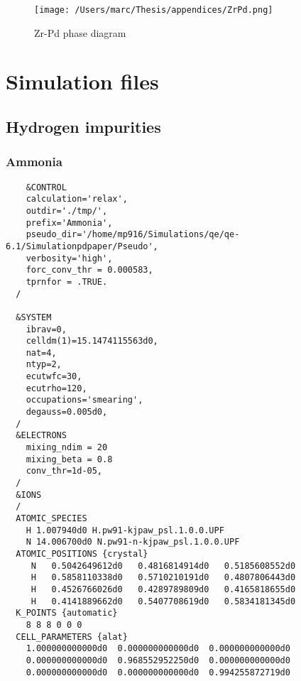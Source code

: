 \begin{figure}[H]
  \texttt{[image: /Users/marc/Thesis/appendices/ZrPd.png]}
  \caption{Zr-Pd phase diagram \cite{WATERSTRAT199963}}
\end{figure}


\section*{Simulation files}
\subsection*{Hydrogen impurities}
\subsubsection*{Ammonia}
\begin{verbatim}
    &CONTROL
    calculation='relax',
    outdir='./tmp/',
    prefix='Ammonia',
    pseudo_dir='/home/mp916/Simulations/qe/qe-6.1/Simulationpdpaper/Pseudo',
    verbosity='high',
    forc_conv_thr = 0.000583,
    tprnfor = .TRUE.
  /
  
  &SYSTEM
    ibrav=0,
    celldm(1)=15.1474115563d0,
    nat=4,
    ntyp=2,
    ecutwfc=30,
    ecutrho=120,
    occupations='smearing',
    degauss=0.005d0,
  /
  &ELECTRONS
    mixing_ndim = 20
    mixing_beta = 0.8
    conv_thr=1d-05,
  /
  &IONS
  /
  ATOMIC_SPECIES
    H 1.007940d0 H.pw91-kjpaw_psl.1.0.0.UPF
    N 14.006700d0 N.pw91-n-kjpaw_psl.1.0.0.UPF
  ATOMIC_POSITIONS {crystal}
     N   0.5042649612d0   0.4816814914d0   0.5185608552d0
     H   0.5858110338d0   0.5710210191d0   0.4807806443d0
     H   0.4526766026d0   0.4289789809d0   0.4165818655d0
     H   0.4141889662d0   0.5407708619d0   0.5834181345d0
  K_POINTS {automatic}
    8 8 8 0 0 0
  CELL_PARAMETERS {alat}
    1.000000000000d0  0.000000000000d0  0.000000000000d0
    0.000000000000d0  0.968552952250d0  0.000000000000d0
    0.000000000000d0  0.000000000000d0  0.994255872719d0
\end{verbatim}
